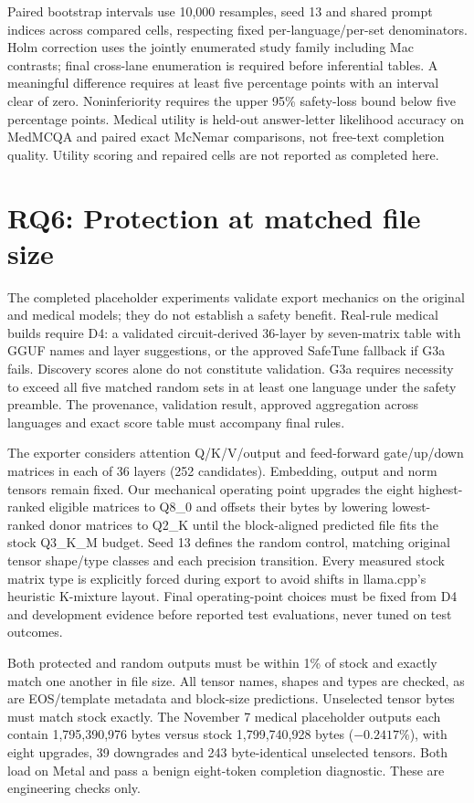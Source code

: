 Paired bootstrap intervals use 10,000 resamples, seed 13 and shared prompt indices across compared cells, respecting fixed per-language/per-set denominators. Holm correction uses the jointly enumerated study family including Mac contrasts; final cross-lane enumeration is required before inferential tables. A meaningful difference requires at least five percentage points with an interval clear of zero. Noninferiority requires the upper 95\% safety-loss bound below five percentage points. Medical utility is held-out answer-letter likelihood accuracy on MedMCQA and paired exact McNemar comparisons, not free-text completion quality. Utility scoring and repaired cells are not reported as completed here.

\section{RQ6: Protection at matched file size}

The completed placeholder experiments validate export mechanics on the original and medical models; they do not establish a safety benefit. Real-rule medical builds require D4: a validated circuit-derived 36-layer by seven-matrix table with GGUF names and layer suggestions, or the approved SafeTune fallback if G3a fails. Discovery scores alone do not constitute validation. G3a requires necessity to exceed all five matched random sets in at least one language under the safety preamble. The provenance, validation result, approved aggregation across languages and exact score table must accompany final rules.

The exporter considers attention Q/K/V/output and feed-forward gate/up/down matrices in each of 36 layers (252 candidates). Embedding, output and norm tensors remain fixed. Our mechanical operating point upgrades the eight highest-ranked eligible matrices to Q8\_0 and offsets their bytes by lowering lowest-ranked donor matrices to Q2\_K until the block-aligned predicted file fits the stock Q3\_K\_M budget. Seed 13 defines the random control, matching original tensor shape/type classes and each precision transition. Every measured stock matrix type is explicitly forced during export to avoid shifts in llama.cpp's heuristic K-mixture layout. Final operating-point choices must be fixed from D4 and development evidence before reported test evaluations, never tuned on test outcomes.

Both protected and random outputs must be within 1\% of stock and exactly match one another in file size. All tensor names, shapes and types are checked, as are EOS/template metadata and block-size predictions. Unselected tensor bytes must match stock exactly. The November 7 medical placeholder outputs each contain 1,795,390,976 bytes versus stock 1,799,740,928 bytes ($-0.2417\%$), with eight upgrades, 39 downgrades and 243 byte-identical unselected tensors. Both load on Metal and pass a benign eight-token completion diagnostic. These are engineering checks only.

